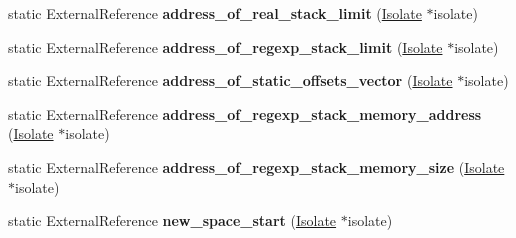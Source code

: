 \begin{DoxyCompactItemize}
\item 
\hypertarget{classv8_1_1internal_1_1_b_a_s_e___e_m_b_e_d_d_e_d_ab1563c770d9c8fdeefb4f8ba8cf6aab0}{}static External\+Reference {\bfseries address\+\_\+of\+\_\+real\+\_\+stack\+\_\+limit} (\hyperlink{classv8_1_1internal_1_1_isolate}{Isolate} $\ast$isolate)\label{classv8_1_1internal_1_1_b_a_s_e___e_m_b_e_d_d_e_d_ab1563c770d9c8fdeefb4f8ba8cf6aab0}

\item 
\hypertarget{classv8_1_1internal_1_1_b_a_s_e___e_m_b_e_d_d_e_d_abe7d2bf25889b5ddbfeae7cd4667f322}{}static External\+Reference {\bfseries address\+\_\+of\+\_\+regexp\+\_\+stack\+\_\+limit} (\hyperlink{classv8_1_1internal_1_1_isolate}{Isolate} $\ast$isolate)\label{classv8_1_1internal_1_1_b_a_s_e___e_m_b_e_d_d_e_d_abe7d2bf25889b5ddbfeae7cd4667f322}

\item 
\hypertarget{classv8_1_1internal_1_1_b_a_s_e___e_m_b_e_d_d_e_d_a00f5a0f064d549f472914638d068fc37}{}static External\+Reference {\bfseries address\+\_\+of\+\_\+static\+\_\+offsets\+\_\+vector} (\hyperlink{classv8_1_1internal_1_1_isolate}{Isolate} $\ast$isolate)\label{classv8_1_1internal_1_1_b_a_s_e___e_m_b_e_d_d_e_d_a00f5a0f064d549f472914638d068fc37}

\item 
\hypertarget{classv8_1_1internal_1_1_b_a_s_e___e_m_b_e_d_d_e_d_a78097b5d109e046fd2c22ce6f7438e7b}{}static External\+Reference {\bfseries address\+\_\+of\+\_\+regexp\+\_\+stack\+\_\+memory\+\_\+address} (\hyperlink{classv8_1_1internal_1_1_isolate}{Isolate} $\ast$isolate)\label{classv8_1_1internal_1_1_b_a_s_e___e_m_b_e_d_d_e_d_a78097b5d109e046fd2c22ce6f7438e7b}

\item 
\hypertarget{classv8_1_1internal_1_1_b_a_s_e___e_m_b_e_d_d_e_d_a7bba663e898a092e9e8007014b96f27b}{}static External\+Reference {\bfseries address\+\_\+of\+\_\+regexp\+\_\+stack\+\_\+memory\+\_\+size} (\hyperlink{classv8_1_1internal_1_1_isolate}{Isolate} $\ast$isolate)\label{classv8_1_1internal_1_1_b_a_s_e___e_m_b_e_d_d_e_d_a7bba663e898a092e9e8007014b96f27b}

\item 
\hypertarget{classv8_1_1internal_1_1_b_a_s_e___e_m_b_e_d_d_e_d_ac8d0985d4f570b57794aad1109da7674}{}static External\+Reference {\bfseries new\+\_\+space\+\_\+start} (\hyperlink{classv8_1_1internal_1_1_isolate}{Isolate} $\ast$isolate)\label{classv8_1_1internal_1_1_b_a_s_e___e_m_b_e_d_d_e_d_ac8d0985d4f570b57794aad1109da7674}


\end{DoxyCompactItemize}
